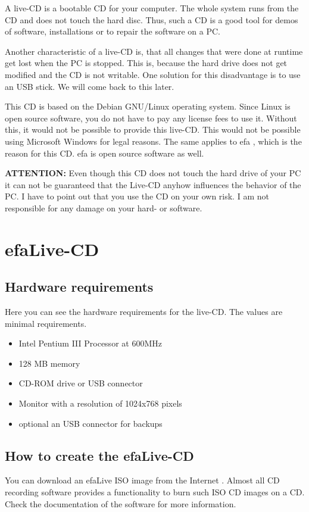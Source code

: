 \documentclass[a4paper,12pt,twoside]{article}
\begin{document}
A live-CD is a bootable CD for your computer. The whole system runs from
the CD and does not touch the hard disc. Thus, such a CD is a good tool
for demos of software, installations or to repair the software on a PC.

Another characteristic of a live-CD is, that all changes that were done
at runtime get lost when the PC is stopped. This is, because the hard
drive does not get modified and the CD is not writable. One solution
for this disadvantage is to use an USB stick. We will come back to this
later.

This CD is based on the Debian GNU/Linux \cite{DEB1} operating system.
Since Linux is open source software, you do not have to pay any license
fees to use it. Without this, it would not be possible to provide this
live-CD. This would not be possible using Microsoft Windows for legal
reasons. The same applies to efa \cite{EFA1}, which is the reason for
this CD. efa is open source software as well.

\bigskip
\textbf{ATTENTION:} Even though this CD does not touch the hard drive of your PC
it can not be guaranteed that the Live-CD anyhow influences the
behavior of the PC. I have to point out that you use the CD on your own
risk. I am not responsible for any damage on your hard- or software.
\bigskip

\section{efaLive-CD}
\label{sct:efalivecd}
\subsection{Hardware requirements}
\label{sct:live_hardware}
Here you can see the hardware requirements for the live-CD. The values
are minimal requirements.

\begin{itemize}
    \item Intel Pentium III Processor at 600MHz
    \item 128 MB memory
    \item CD-ROM drive or USB connector
    \item Monitor with a resolution of 1024x768 pixels
    \item optional an USB connector for backups
\end{itemize}

\subsection{How to create the efaLive-CD}
\label{sct:create_cd}
You can download an efaLive ISO image from the Internet \cite{EFA4}.
Almost all CD recording software provides a functionality to burn such
ISO CD images on a CD. Check the documentation of the software for more
information.
\end{document}
